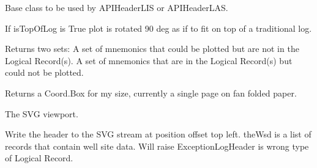 \documentclass[letterpaper,10pt,english]{sphinxmanual}
\begin{document}
\begin{fulllineitems}
\label{\detokenize{ref/util/plot/LogHeader:TotalDepth.util.plot.LogHeader.APIHeaderBase}}
Base class to be used by APIHeaderLIS or APIHeaderLAS.

If isTopOfLog is True plot is rotated 90 deg as if to fit on top of a traditional log.

\begin{fulllineitems}
\label{\detokenize{ref/util/plot/LogHeader:TotalDepth.util.plot.LogHeader.APIHeaderBase.missingFields}}
Returns two sets:
A set of mnemonics that could be plotted but are not in the Logical Record(s).
A set of mnemonics that are in the Logical Record(s) but could not be plotted.

\end{fulllineitems}


\begin{fulllineitems}
\label{\detokenize{ref/util/plot/LogHeader:TotalDepth.util.plot.LogHeader.APIHeaderBase.size}}
Returns a Coord.Box for my size, currently a single page on fan folded paper.

\end{fulllineitems}


\begin{fulllineitems}
\label{\detokenize{ref/util/plot/LogHeader:TotalDepth.util.plot.LogHeader.APIHeaderBase.viewPort}}
The SVG viewport.

\end{fulllineitems}


\begin{fulllineitems}
\label{\detokenize{ref/util/plot/LogHeader:TotalDepth.util.plot.LogHeader.APIHeaderBase.plot}}
Write the header to the SVG stream at position offset top left.
theWsd is a list of records that contain well site data.
Will raise ExceptionLogHeader is wrong type of Logical Record.

\end{fulllineitems}


\end{fulllineitems}
\end{document}
